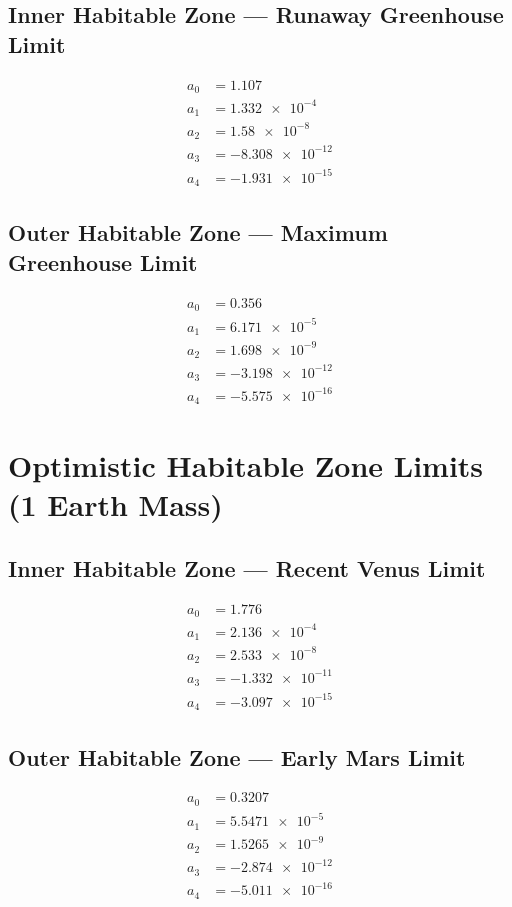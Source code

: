 \documentclass{article}
\begin{document}
\subsection{Inner Habitable Zone --- Runaway Greenhouse Limit}
\begin{align*}
	a_{0} & =\num{1.107}      \\
	a_{1} & =\num{1.332e-4}   \\
	a_{2} & =\num{1.58e-8}    \\
	a_{3} & =\num{-8.308e-12} \\
	a_{4} & =\num{-1.931e-15}
\end{align*}

\subsection{Outer Habitable Zone --- Maximum Greenhouse Limit}
\begin{align*}
	a_{0} & =\num{0.356}      \\
	a_{1} & =\num{6.171e-5}   \\
	a_{2} & =\num{1.698e-9}   \\
	a_{3} & =\num{-3.198e-12} \\
	a_{4} & =\num{-5.575e-16}
\end{align*}

\section{Optimistic Habitable Zone Limits (1 Earth Mass)}

\subsection{Inner Habitable Zone --- Recent Venus Limit}
\begin{align*}
	a_{0} & =\num{1.776}      \\
	a_{1} & =\num{2.136e-4}   \\
	a_{2} & =\num{2.533e-8}   \\
	a_{3} & =\num{-1.332e-11} \\
	a_{4} & =\num{-3.097e-15}
\end{align*}
\subsection{Outer Habitable Zone --- Early Mars Limit}
\begin{align*}
	a_{0} & =\num{0.3207}     \\
	a_{1} & =\num{5.5471e-5}  \\
	a_{2} & =\num{1.5265e-9}  \\
	a_{3} & =\num{-2.874e-12} \\
	a_{4} & =\num{-5.011e-16}
\end{align*}
\end{document}
